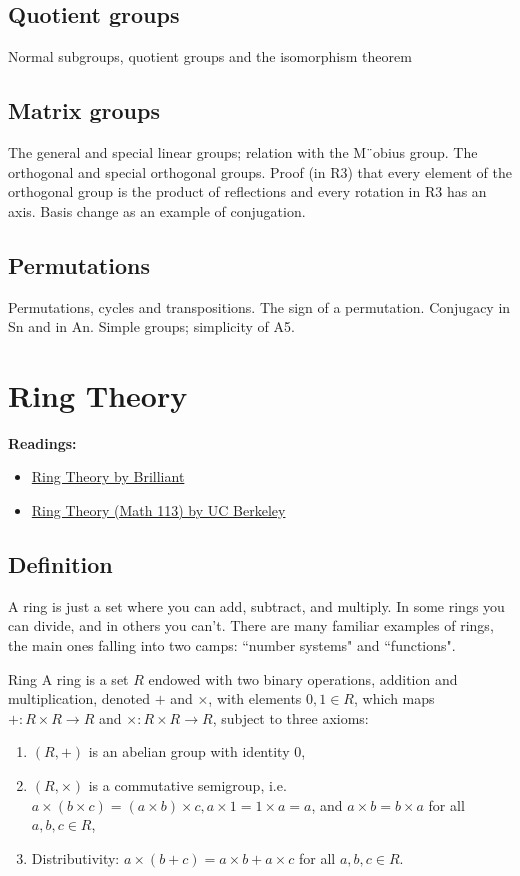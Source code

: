 \section{Quotient groups}
Normal subgroups, quotient groups and the isomorphism theorem

\section{Matrix groups}
The general and special linear groups; relation with the M¨obius group. The orthogonal and special orthogonal groups. Proof (in R3) that every element of the orthogonal group is the product of reflections and every rotation in R3 has an axis. Basis change as an example of conjugation.

\section{Permutations}
Permutations, cycles and transpositions. The sign of a permutation. Conjugacy in Sn and in An. Simple groups; simplicity of A5.

\chapter{Ring Theory}
\textbf{Readings:}
\begin{itemize}
\item \href{https://brilliant.org/wiki/ring-theory/}{Ring Theory by Brilliant}
\item \href{https://math.berkeley.edu/~gmelvin/math113su14/math113su14notes2.pdf}{Ring Theory (Math 113) by UC Berkeley}
\end{itemize}

\section{Definition}
A ring is just a set where you can add, subtract, and multiply. In some rings you can divide, and in others you can’t. There are many familiar examples of rings, the main ones falling into two camps: ``number systems" and ``functions".

\begin{defn}{Ring}{}
A ring is a set $R$ endowed with two binary operations, addition and multiplication, denoted $+$ and $\times$, with elements $0,1\in R$, which maps $+: R \times R \to R$ and $\times: R \times R \to R$, subject to three axioms:
\begin{enumerate}[label=R\arabic*]
\item $(R,+)$ is an abelian group with identity 0,
\item $(R,\times)$ is a commutative semigroup, i.e. $a \times (b \times c) = (a \times b) \times c, a \times 1 = 1 \times a = a$, and $a \times b = b \times a$ for all $a, b, c \in R$,
\item Distributivity: $a \times (b + c) = a \times b + a \times c$ for all $a, b, c \in R$.
\end{enumerate}
\end{defn}

